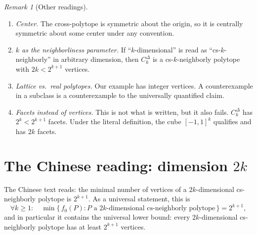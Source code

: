 \documentclass[11pt]{article}
\theoremstyle{definition}
\theoremstyle{remark}
\newtheorem{remark}[theorem]{Remark}
\begin{document}
\begin{remark}[Other readings]\label{rem:readings}
\begin{enumerate}
\item \emph{Center.} The cross-polytope is symmetric about the origin, so it is
centrally symmetric about some center under any convention.
\item \emph{$k$ as the neighborliness parameter.} If ``$k$-dimensional'' is read as
``cs-$k$-neighborly'' in arbitrary dimension, then $C^\Delta_k$ is a cs-$k$-neighborly
polytope with $2k<2^{k+1}$ vertices.
\item \emph{Lattice vs.\ real polytopes.} Our example has integer vertices. A
counterexample in a subclass is a counterexample to the universally quantified claim.
\item \emph{Facets instead of vertices.} This is not what is written, but it also fails.
$C^\Delta_k$ has $2^k<2^{k+1}$ facets. Under the literal definition, the cube $[-1,1]^k$
qualifies and has $2k$ facets.
\end{enumerate}
\end{remark}

\section{\texorpdfstring{The Chinese reading: dimension $2k$}{The Chinese reading: dimension 2k}}\label{sec:cn}
The Chinese text reads: the minimal number of vertices of a $2k$-dimensional cs-neighborly
polytope is $2^{k+1}$. As a universal statement, this is
\begin{equation}\label{eq:cn}
\forall k\ge1:\quad \min\{\,f_0(P) : P \text{ a $2k$-dimensional cs-neighborly polytope}\,\}=2^{k+1},
\end{equation}
and in particular it contains the universal lower bound: every $2k$-dimensional cs-neighborly
polytope has at least $2^{k+1}$ vertices.
\end{document}
